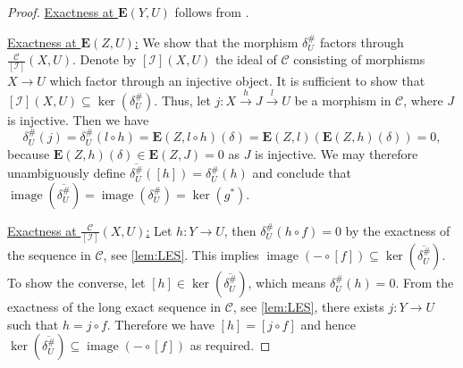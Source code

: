 \documentclass[10pt,twoside, a4paper,reqno]{amsart}
\DeclareMathOperator{\image}{image}
\newcommand{\calI}{\mathcal{I}}
\newcommand{\calC}{\mathcal{C}}
\newcommand{\E}{\mathbf{E}}
\theoremstyle{definition}
\begin{document}
\begin{proof}
	\underline{Exactness at $\E(Y,U)$} follows from .
	
	\underline{Exactness at $\E(Z,U)$:} We show that the morphism $\delta_U^{\#}$ factors through $\frac{\calC}{[\calI]}(X,U)$. Denote by $[\calI](X,U)$ the ideal of $\calC$ consisting of morphisms $X \to U$ which factor through an injective object. It is sufficient to show that $[\calI](X,U) \subseteq \ker(\delta_U^{\#})$. Thus, let $j: X \xrightarrow{h} J \xrightarrow{l} U$ be a morphism in $\calC$, where $J$ is injective. Then we have
	\[\delta_U^{\#}(j) = \delta_U^{\#}(l\circ h) = \E(Z,l\circ h)(\delta) =\E(Z,l)\left(\E(Z,h)(\delta)\right)=0,\]
	because $\E(Z,h)(\delta) \in \E(Z,J)= 0$ as $J$ is injective. We may therefore unambiguously define $\overline{\delta_U^{\#}}([h]) = \delta_U^{\#}(h)$ and conclude that $\image (\overline{\delta_U^{\#}})= \image(\delta_U^{\#}) = \ker( g^*)$.
	
	\underline{Exactness at $\frac{\calC}{[\calI]}(X,U)$:} Let $h: Y \to U$, then $\delta_U^{\#}(h \circ f) = 0$ by the exactness of the sequence in $\calC$, see \cref{lem:LES}. This implies $\image( - \circ {[f]}) \subseteq \ker(\overline{\delta_U^{\#}})$. To show the converse, let $[h] \in \ker(\overline{\delta_U^{\#}})$, which means $\delta_U^{\#}(h) = 0$. From the exactness of the long exact sequence in $\calC$, see \cref{lem:LES}, there exists $j: Y \to U$ such that $h = j \circ f$. Therefore we have $[h] = [j \circ f]$ and hence $\ker(\overline{\delta_U^{\#}}) \subseteq \image(- \circ {[f]})$ as required.
	

\end{proof}
\end{document}
